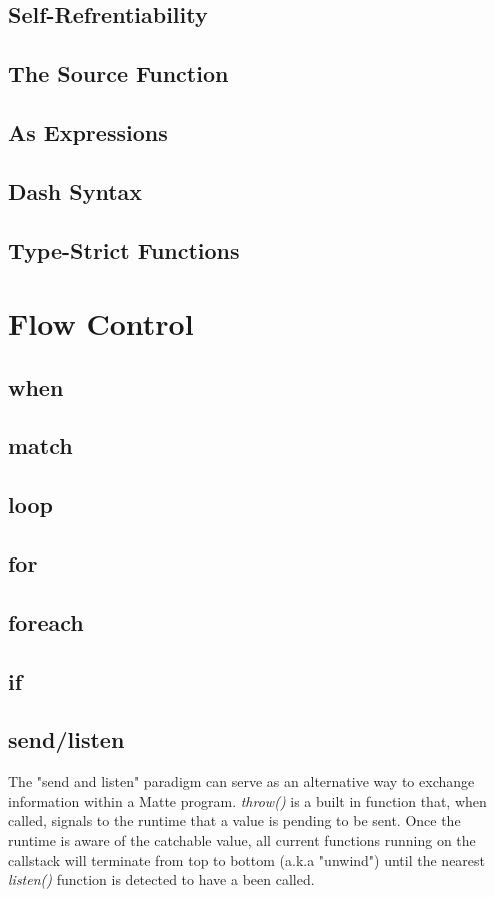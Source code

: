 \documentclass[12pt,letterpaper]{report}
\begin{document}
\section{Self-Refrentiability}
\section{The Source Function}
\section{As Expressions}
\section{Dash Syntax}
\section{Type-Strict Functions}
\chapter{Flow Control}
\section{when}
\section{match}
\section{loop}
\section{for}
\section{foreach}
\section{if}
\section{send/listen}

The "send and listen" paradigm can serve as an alternative way to exchange information within 
a Matte program. \textit{throw()} is a built in function that, when called, signals to the runtime
that a value is pending to be sent. Once the runtime is aware of the catchable value, all current 
functions running on the callstack will terminate from top to bottom (a.k.a "unwind") until the nearest
\textit{listen()} function is detected to have a been called.
\end{document}
